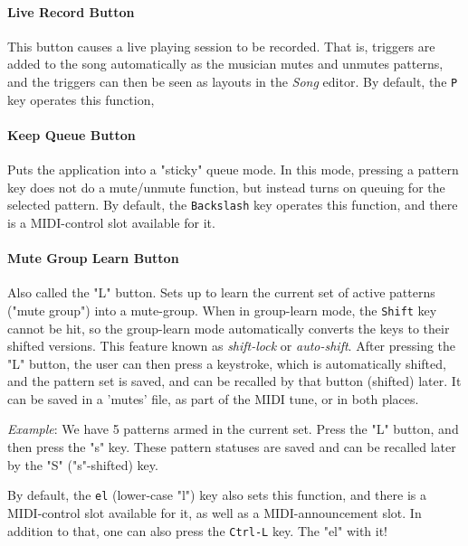\documentclass[
 11pt,
 twoside,
 a4paper,
 final                                 %
]{article}
\begin{document}
\paragraph{Live Record Button}
\label{paragraph:introduction_live_record_button}

   This button causes a live playing session to be recorded.
   That is, triggers are added to the song automatically as the musician mutes
   and unmutes patterns, and the triggers can then be
   seen as layouts in the \textsl{Song} editor.
   By default, the \texttt{P} key operates this function,

\paragraph{Keep Queue Button}
\label{paragraph:introduction_keep_queue_button}

   Puts the application into a "sticky" queue mode.
   In this mode, pressing a pattern key does not do a mute/unmute function, but
   instead turns on queuing for the selected pattern.
   By default, the \texttt{Backslash} key operates this function,
   and there is a MIDI-control slot available for it.

\paragraph{Mute Group Learn Button}
\label{paragraph:introduction_mute_group_learn_button}

   Also called the "L" button.
   Sets up to learn the current set of active patterns ("mute group") into a
   mute-group.
   When in group-learn mode, the \texttt{Shift} key cannot be hit, so the
   group-learn mode automatically converts the keys to their shifted versions.
   This feature known as \textsl{shift-lock} or \textsl{auto-shift}.
   After pressing the "L" button, the user can then press a keystroke, which is
   automatically shifted, and the pattern set is saved, and can be recalled by
   that button (shifted) later.  It can be saved in a 'mutes' file, as part of
   the MIDI tune, or in both places.

   \textsl{Example}:
   We have 5 patterns armed in the current set. Press the "L" button,
   and then press the "s" key.  These pattern statuses are saved and can be
   recalled later by the "S" ("s"-shifted) key.

   By default, the \texttt{el} (lower-case "l") key also sets this function,
   and there is a MIDI-control slot available for it, as well as a
   MIDI-announcement slot.
   In addition to that, one can also press
   the \texttt{Ctrl-L} key.
   The "el" with it!
\end{document}
